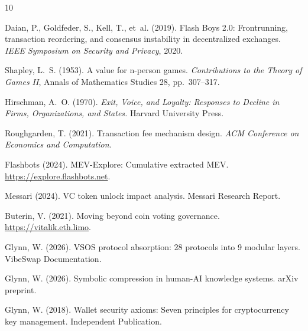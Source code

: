 \documentclass[11pt, a4paper]{article}
\begin{document}

\begin{thebibliography}{10}

Daian, P., Goldfeder, S., Kell, T., et~al. (2019).
\newblock Flash Boys 2.0: Frontrunning, transaction reordering, and consensus instability in decentralized exchanges.
\newblock \emph{IEEE Symposium on Security and Privacy}, 2020.

Shapley, L.~S. (1953).
\newblock A value for n-person games.
\newblock \emph{Contributions to the Theory of Games II}, Annals of Mathematics Studies 28, pp.~307--317.

Hirschman, A.~O. (1970).
\newblock \emph{Exit, Voice, and Loyalty: Responses to Decline in Firms, Organizations, and States.}
\newblock Harvard University Press.

Roughgarden, T. (2021).
\newblock Transaction fee mechanism design.
\newblock \emph{ACM Conference on Economics and Computation}.

{Flashbots} (2024).
\newblock MEV-Explore: Cumulative extracted MEV.
\newblock \url{https://explore.flashbots.net}.

{Messari} (2024).
\newblock VC token unlock impact analysis.
\newblock Messari Research Report.

Buterin, V. (2021).
\newblock Moving beyond coin voting governance.
\newblock \url{https://vitalik.eth.limo}.

Glynn, W. (2026).
\newblock VSOS protocol absorption: 28 protocols into 9 modular layers.
\newblock VibeSwap Documentation.

Glynn, W. (2026).
\newblock Symbolic compression in human-{AI} knowledge systems.
\newblock arXiv preprint.

Glynn, W. (2018).
\newblock Wallet security axioms: Seven principles for cryptocurrency key management.
\newblock Independent Publication.

\end{thebibliography}
\end{document}
